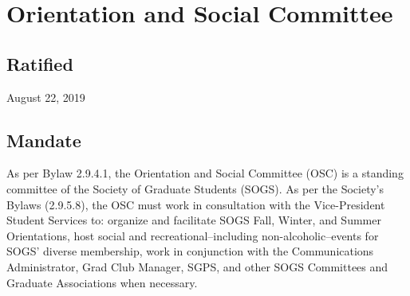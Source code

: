 \section{Orientation and Social Committee}
\subsection{Ratified}
August 22, 2019
\subsection{Mandate}
As per Bylaw 2.9.4.1, the Orientation and Social Committee (OSC) is a standing committee of the Society of Graduate Students (SOGS). As per the Society's Bylaws (2.9.5.8), the OSC must work in consultation with the Vice-President Student Services to: organize and facilitate SOGS Fall, Winter, and Summer Orientations, host social and recreational--including non-alcoholic--events for SOGS' diverse membership, work in conjunction with the Communications Administrator, Grad Club Manager, SGPS, and other SOGS Committees and Graduate Associations when necessary.

